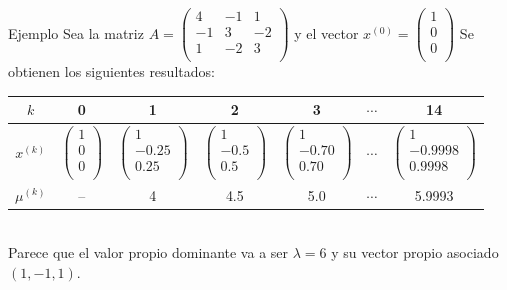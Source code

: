 \documentclass[11pt]{beamer}
\begin{document}
    \begin{frame}{Ejemplo}
      Sea la matriz $A=\left(\begin{array}{ccc}
        4 & -1& 1\\
-1 & 3 & -2\\
1 & -2 & 3\\
       \end{array}\right)$ y el vector $x^{(0)}=\left(\begin{array}{c}
        1\\0\\0\\\end{array}\right)$   
    Se obtienen los siguientes resultados:\\[10pt]
    {\scriptsize
    \begin{tabular}{|c|c|c|c|c|c|c|}\hline
      $k$ & 0 & 1 & 2 & 3 & $\cdots$ & 14\\\hline
      $x^{(k)}$ & $\left(\begin{array}{c}1\\0\\0\\\end{array}\right)$ & $\left(\begin{array}{c}1\\-0.25\\0.25\\\end{array}\right)$ & $\left(\begin{array}{c}1\\-0.5\\0.5\\\end{array}\right)$ & $\left(\begin{array}{c}1\\-0.70\\0.70\\\end{array}\right)$ & $\cdots$ & $\left(\begin{array}{c}1\\-0.9998\\0.9998\\\end{array}\right)$\\\hline
      $\mu^{(k)}$ & -- & 4 & 4.5 & 5.0 & $\cdots$ & 5.9993\\\hline
    \end{tabular}}\\[10pt]
    Parece que el valor propio dominante va a ser $\lambda = 6$ y su vector propio asociado $(1,-1,1)$.
  \end{frame}
  
\end{document}
